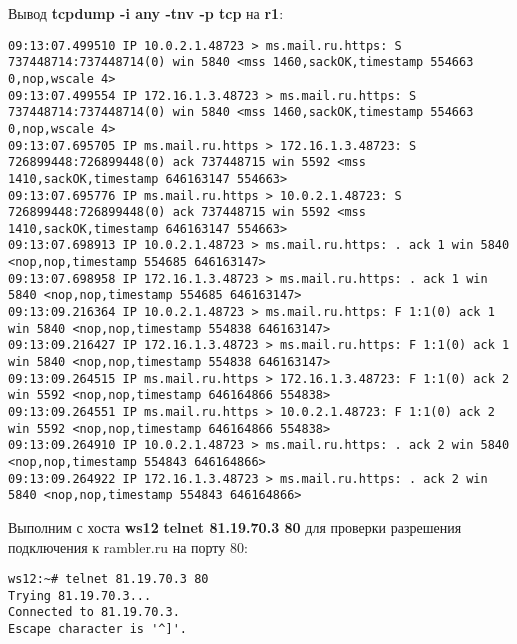 \documentclass[a4paper,12pt]{article}
\begin{document}
Вывод \textbf{tcpdump -i any -tnv -p tcp} на \textbf{r1}:
\begin{Verbatim}
09:13:07.499510 IP 10.0.2.1.48723 > ms.mail.ru.https: S 737448714:737448714(0) win 5840 <mss 1460,sackOK,timestamp 554663 0,nop,wscale 4>
09:13:07.499554 IP 172.16.1.3.48723 > ms.mail.ru.https: S 737448714:737448714(0) win 5840 <mss 1460,sackOK,timestamp 554663 0,nop,wscale 4>
09:13:07.695705 IP ms.mail.ru.https > 172.16.1.3.48723: S 726899448:726899448(0) ack 737448715 win 5592 <mss 1410,sackOK,timestamp 646163147 554663>
09:13:07.695776 IP ms.mail.ru.https > 10.0.2.1.48723: S 726899448:726899448(0) ack 737448715 win 5592 <mss 1410,sackOK,timestamp 646163147 554663>
09:13:07.698913 IP 10.0.2.1.48723 > ms.mail.ru.https: . ack 1 win 5840 <nop,nop,timestamp 554685 646163147>
09:13:07.698958 IP 172.16.1.3.48723 > ms.mail.ru.https: . ack 1 win 5840 <nop,nop,timestamp 554685 646163147>
09:13:09.216364 IP 10.0.2.1.48723 > ms.mail.ru.https: F 1:1(0) ack 1 win 5840 <nop,nop,timestamp 554838 646163147>
09:13:09.216427 IP 172.16.1.3.48723 > ms.mail.ru.https: F 1:1(0) ack 1 win 5840 <nop,nop,timestamp 554838 646163147>
09:13:09.264515 IP ms.mail.ru.https > 172.16.1.3.48723: F 1:1(0) ack 2 win 5592 <nop,nop,timestamp 646164866 554838>
09:13:09.264551 IP ms.mail.ru.https > 10.0.2.1.48723: F 1:1(0) ack 2 win 5592 <nop,nop,timestamp 646164866 554838>
09:13:09.264910 IP 10.0.2.1.48723 > ms.mail.ru.https: . ack 2 win 5840 <nop,nop,timestamp 554843 646164866>
09:13:09.264922 IP 172.16.1.3.48723 > ms.mail.ru.https: . ack 2 win 5840 <nop,nop,timestamp 554843 646164866>
\end{Verbatim}

Выполним с хоста \textbf{ws12} \textbf{telnet 81.19.70.3 80} для проверки
разрешения подключения к rambler.ru на порту 80:
\begin{Verbatim}
ws12:~# telnet 81.19.70.3 80
Trying 81.19.70.3...
Connected to 81.19.70.3.
Escape character is '^]'.
\end{Verbatim}
\end{document}
